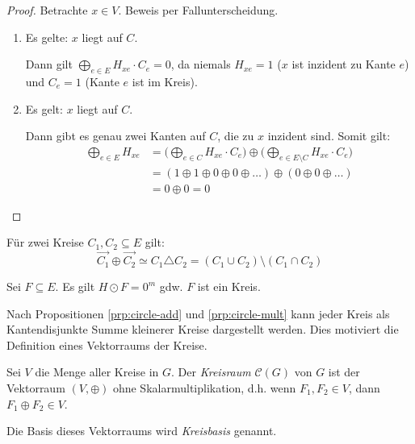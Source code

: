 \begin{proof}
    Betrachte $ x \in V $.
    Beweis per Fallunterscheidung.
    \begin{enumerate}
        \item Es gelte: $ x $ liegt auf $ C $.

        Dann gilt $ \bigoplus_{e \in E} H_{xe} \cdot C_e = 0 $, da niemals $ H_{xe} = 1 $ ($ x $ ist inzident zu Kante $ e $) und $ C_e = 1 $ (Kante $ e $ ist im Kreis).

        \item Es gelt: $ x $ liegt auf $ C $.

        Dann gibt es genau zwei Kanten auf $ C $, die zu $ x $ inzident sind.
        Somit gilt:
        \begin{align*}
            \bigoplus_{e \in E} H_{xe} &= \big(\bigoplus_{e \in C} H_{xe} \cdot C_e\big) \oplus \big(\bigoplus_{e \in E \setminus C} H_{xe} \cdot C_e\big) \\
            &= (1 \oplus 1 \oplus 0 \oplus 0 \oplus \dots) \oplus (0 \oplus 0 \oplus \dots) \\
            &= 0 \oplus 0 = 0
        \end{align*}
    \end{enumerate}
\end{proof}

\begin{proposition}
    \label{prp:circle-add}
    Für zwei Kreise $ C_1, C_2 \subseteq E $ gilt:
    \begin{equation*}
        \vec{C_1} \oplus \vec{C_2} \simeq C_1 \triangle C_2 = (C_1 \cup C_2) \setminus (C_1 \cap C_2)
    \end{equation*}
\end{proposition}

\begin{proposition}
    \label{prp:circle-mult}
    Sei $ F \subseteq E $.
    Es gilt $ H \odot F = 0^m $ gdw. $ F $ ist ein Kreis.
\end{proposition}

\begin{remark}
    Nach Propositionen \ref{prp:circle-add} und \ref{prp:circle-mult} kann jeder Kreis als Kantendisjunkte Summe kleinerer Kreise dargestellt werden.
    Dies motiviert die Definition eines Vektorraums der Kreise.
\end{remark}

\begin{definition}[Kreisraum]
    Sei $ V $ die Menge aller Kreise in $ G $.
    Der \textit{Kreisraum} $ \mathcal{C}(G) $ von $ G $ ist der Vektorraum $ (V, \oplus) $ ohne Skalarmultiplikation, d.h. wenn $ F_1, F_2 \in V $, dann $ F_1 \oplus F_2 \in V $.

    Die Basis dieses Vektorraums wird \textit{Kreisbasis} genannt.
\end{definition}

